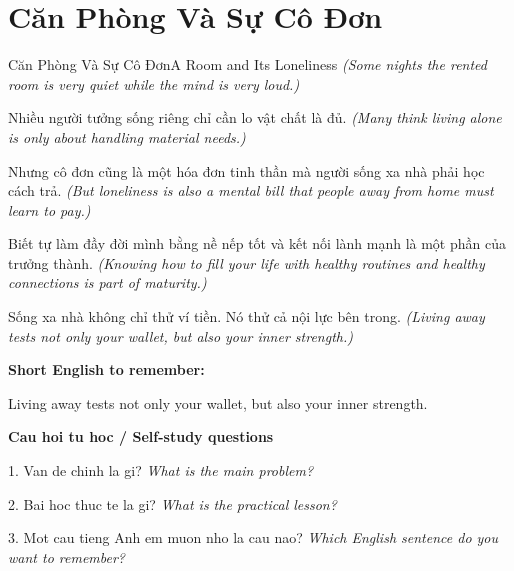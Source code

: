 \section{Căn Phòng Và Sự Cô Đơn}
\begin{truyen}{Căn Phòng Và Sự Cô Đơn}{A Room and Its Loneliness}
\textit{(Some nights the rented room is very quiet while the mind is very loud.)}

Nhiều người tưởng sống riêng chỉ cần lo vật chất là đủ.
\textit{(Many think living alone is only about handling material needs.)}

Nhưng cô đơn cũng là một hóa đơn tinh thần mà người sống xa nhà phải học cách trả.
\textit{(But loneliness is also a mental bill that people away from home must learn to pay.)}

Biết tự làm đầy đời mình bằng nề nếp tốt và kết nối lành mạnh là một phần của trưởng thành.
\textit{(Knowing how to fill your life with healthy routines and healthy connections is part of maturity.)}

\end{truyen}

\begin{baihoc}
Sống xa nhà không chỉ thử ví tiền. Nó thử cả nội lực bên trong.
\textit{(Living away tests not only your wallet, but also your inner strength.)}
\end{baihoc}

\begin{ghinhoanh}
\textbf{Short English to remember:}

Living away tests not only your wallet, but also your inner strength.

\end{ghinhoanh}

\begin{tuhocnhanh}
\textbf{Cau hoi tu hoc / Self-study questions}

1. Van de chinh la gi? \textit{What is the main problem?}

2. Bai hoc thuc te la gi? \textit{What is the practical lesson?}

3. Mot cau tieng Anh em muon nho la cau nao? \textit{Which English sentence do you want to remember?}
\end{tuhocnhanh}
\ngancach

